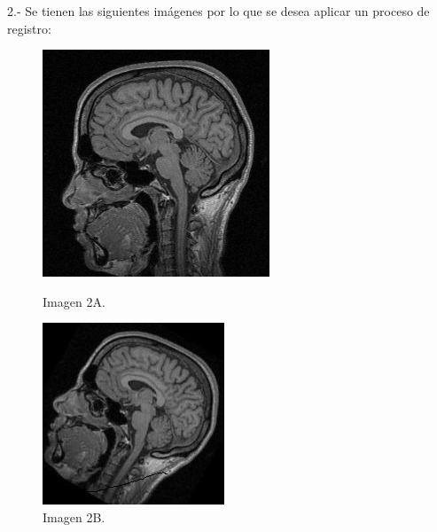 \documentclass[11pt, letterpaper]{article}
\begin{document}
2.- Se tienen las siguientes imágenes por lo que se desea aplicar un proceso de registro:

\begin{figure}[h!]
	\centering
	\begin{minipage}{0.48\textwidth} %
		\centering
		\includegraphics[width=\textwidth]{Imagen2_A.jpg}
		\caption{Imagen 2A.}
		\label{fig:imagen1}
	\end{minipage}\hfill %
	\begin{minipage}{0.48\textwidth} %
		\centering
		\includegraphics[width=\textwidth]{Imagen2_B.jpg}
		\caption{Imagen 2B.}
		\label{fig:imagen2}
	\end{minipage}
\end{figure}
\end{document}
